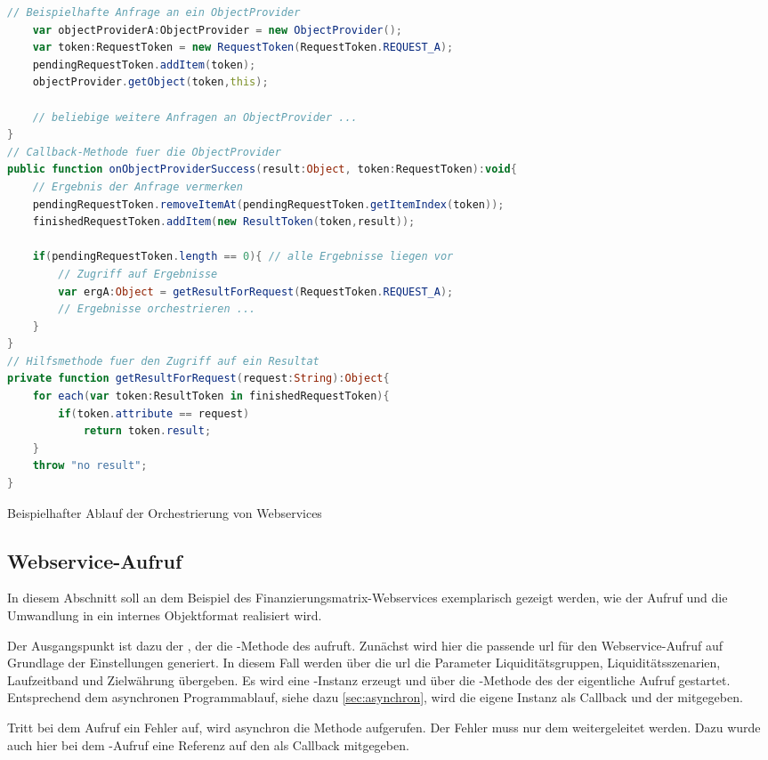 \begin{onehalfspacing}
\begin{programm}[ht]
\begin{lstlisting}[language=ActionScript]
	// Beispielhafte Anfrage an ein ObjectProvider
	var objectProviderA:ObjectProvider = new ObjectProvider();
	var token:RequestToken = new RequestToken(RequestToken.REQUEST_A);
	pendingRequestToken.addItem(token);
	objectProvider.getObject(token,this);
	
	// beliebige weitere Anfragen an ObjectProvider ...
}
// Callback-Methode fuer die ObjectProvider
public function onObjectProviderSuccess(result:Object, token:RequestToken):void{
	// Ergebnis der Anfrage vermerken
	pendingRequestToken.removeItemAt(pendingRequestToken.getItemIndex(token));
	finishedRequestToken.addItem(new ResultToken(token,result));
	
	if(pendingRequestToken.length == 0){ // alle Ergebnisse liegen vor
		// Zugriff auf Ergebnisse
		var ergA:Object = getResultForRequest(RequestToken.REQUEST_A);
		// Ergebnisse orchestrieren ...
	}
}
// Hilfsmethode fuer den Zugriff auf ein Resultat	
private function getResultForRequest(request:String):Object{
	for each(var token:ResultToken in finishedRequestToken){
		if(token.attribute == request)
			return token.result;
	}
	throw "no result";
}
\end{lstlisting}
\caption{Beispielhafter Ablauf der Orchestrierung von Webservices\label{listing:orchestrierung:webservices}}
\end{programm}


\subsection{Webservice-Aufruf}
In diesem Abschnitt soll an dem Beispiel des Finanzierungsmatrix-Webservices exemplarisch gezeigt werden, wie der Aufruf und die Umwandlung in ein internes Objektformat realisiert wird.

Der Ausgangspunkt ist dazu der , der die -Methode des  aufruft. Zunächst wird hier die passende \gls{url} für den Webservice-Aufruf auf Grundlage der Einstellungen generiert. In diesem Fall werden über die \gls{url} die Parameter Liquiditätsgruppen, Liquiditätsszenarien, Laufzeitband und Zielwährung übergeben. Es wird eine -Instanz erzeugt und über die -Methode des  der eigentliche Aufruf gestartet. Entsprechend dem asynchronen Programmablauf, siehe dazu \vref{sec:asynchron}, wird die eigene Instanz als Callback und der  mitgegeben.

Tritt bei dem Aufruf ein Fehler auf, wird asynchron die Methode  aufgerufen. Der Fehler muss nur dem  weitergeleitet werden. Dazu wurde auch hier bei dem -Aufruf eine Referenz auf den  als Callback mitgegeben.


\end{onehalfspacing}
